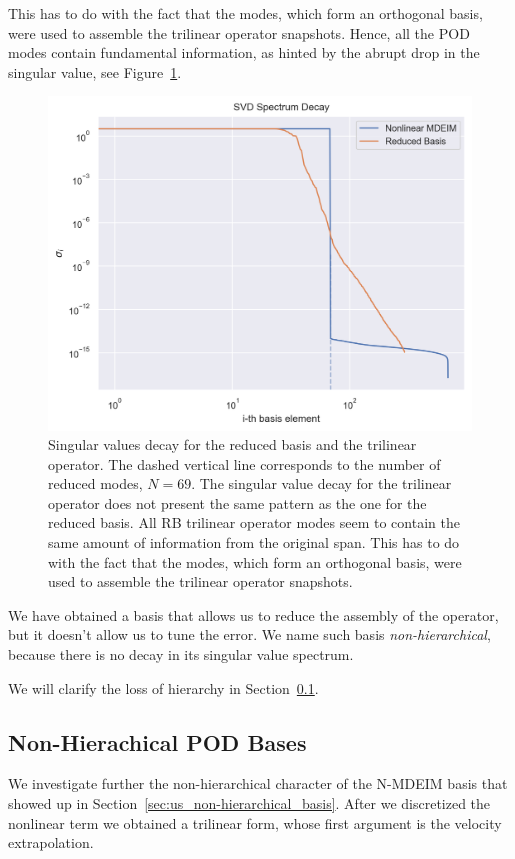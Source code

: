 \documentclass[../../thesis.tex]{subfiles}
\begin{document}
This has to do with the fact that the modes,
which form an orthogonal basis, were used to assemble the trilinear operator snapshots.
Hence, all the POD modes contain fundamental information,
as hinted by the abrupt drop in the singular value, see Figure~\ref{fig:sigmas_decay}. 
\begin{figure}
    \centering
    \includegraphics[width=1\columnwidth]{research_project/piston/figures/mdeim_certification/sigmas_problem.png}
    \caption{Singular values decay for the reduced basis and the trilinear operator.
    The dashed vertical line corresponds to the number of reduced modes, $N=69$.
    The singular value decay for the trilinear operator does 
    not present the same pattern as the one for the reduced basis.
    All RB trilinear operator modes 
    seem to contain the same amount of information from the original span.
    This has to do with the fact that the modes,
    which form an orthogonal basis, 
    were used to assemble the trilinear operator snapshots.}
    \label{fig:sigmas_decay}
\end{figure}
We have obtained a basis that allows us to reduce the assembly of the operator, 
but it doesn't allow us to tune the error.
We name such basis \textit{non-hierarchical}, 
because there is no decay in its singular value spectrum.

We will clarify the loss of hierarchy in Section~\ref{sec:nonhierachical_pod_bases}.

\newpage
\subsection{Non-Hierachical POD Bases}
\label{sec:nonhierachical_pod_bases}
We investigate further the non-hierarchical character of the N-MDEIM basis
that showed up in Section~\ref{sec:us_non-hierarchical_basis}.
After we discretized the nonlinear term we obtained a trilinear form,
whose first argument is the velocity extrapolation.
\end{document}
